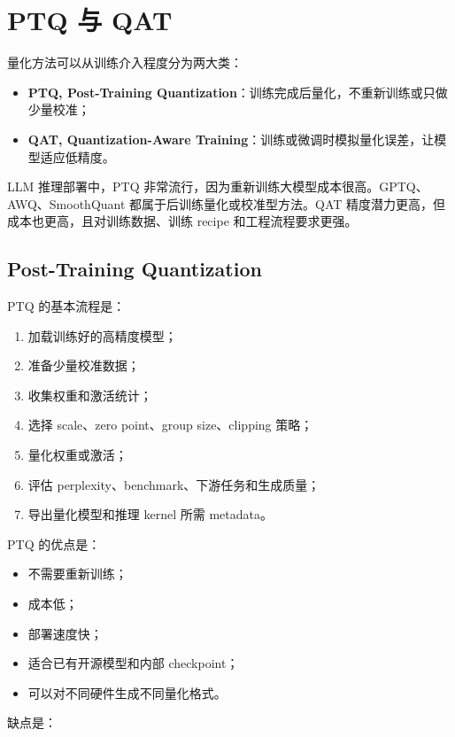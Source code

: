 \section{PTQ 与 QAT}
\label{sec:ptq-and-qat}

量化方法可以从训练介入程度分为两大类：

\begin{itemize}
\item \textbf{PTQ, Post-Training Quantization}：训练完成后量化，不重新训练或只做少量校准；
\item \textbf{QAT, Quantization-Aware Training}：训练或微调时模拟量化误差，让模型适应低精度。
\end{itemize}

LLM 推理部署中，PTQ 非常流行，因为重新训练大模型成本很高。GPTQ、AWQ、SmoothQuant 都属于后训练量化或校准型方法。QAT 精度潜力更高，但成本也更高，且对训练数据、训练 recipe 和工程流程要求更强。

\subsection{Post-Training Quantization}
\label{subsec:post-training-quantization}

PTQ 的基本流程是：

\begin{enumerate}
\item 加载训练好的高精度模型；
\item 准备少量校准数据；
\item 收集权重和激活统计；
\item 选择 scale、zero point、group size、clipping 策略；
\item 量化权重或激活；
\item 评估 perplexity、benchmark、下游任务和生成质量；
\item 导出量化模型和推理 kernel 所需 metadata。
\end{enumerate}

PTQ 的优点是：

\begin{itemize}
\item 不需要重新训练；
\item 成本低；
\item 部署速度快；
\item 适合已有开源模型和内部 checkpoint；
\item 可以对不同硬件生成不同量化格式。
\end{itemize}

缺点是：

